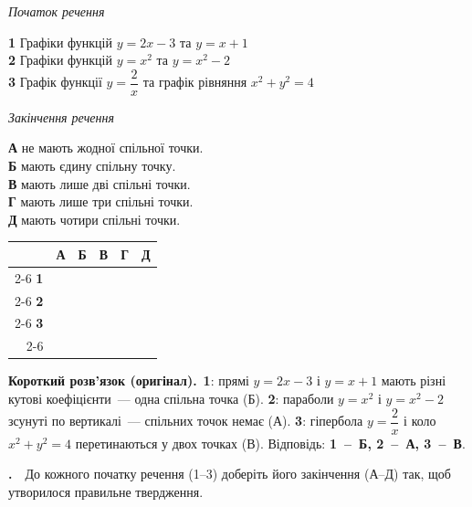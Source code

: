 \documentclass[12pt]{article}
\newcommand{\matchingGrid}{%
    \begingroup
    \renewcommand{\arraystretch}{1.15}
    \setlength{\tabcolsep}{4pt}
    \footnotesize
    \begin{tabular}{r|c|c|c|c|c|}
         \multicolumn{1}{c}{} & \multicolumn{1}{c}{\textbf{А}} & \multicolumn{1}{c}{\textbf{Б}} & \multicolumn{1}{c}{\textbf{В}} & \multicolumn{1}{c}{\textbf{Г}} & \multicolumn{1}{c}{\textbf{Д}} \\ \cline{2-6}
         \textbf{1} & \phantom{X} & \phantom{X} & \phantom{X} & \phantom{X} & \phantom{X} \\ \cline{2-6}
         \textbf{2} & & & & & \\ \cline{2-6}
         \textbf{3} & & & & & \\ \cline{2-6}
    \end{tabular}
    \endgroup
}
\newcounter{zad}
\newcommand{\zadnum}{\stepcounter{zad}\textbf{\thezad.}\ \ }
\newcommand{\solution}[1]{%
\par\vspace{0.12cm}
\begin{tcolorbox}[colback=titleBg!45, colframe=mainGreen!55, boxrule=0.4pt, arc=2pt,
    left=6pt, right=6pt, top=3pt, bottom=3pt, breakable]
\footnotesize\textbf{Короткий розв'язок (оригінал).}\ #1
\end{tcolorbox}
\par\vspace{0.12cm}
}
\begin{document}
\vspace{0.3cm}
\noindent
\begin{minipage}[t]{0.42\textwidth}
\textit{Початок речення}\par\vspace{0.2cm}
\textbf{1} \quad Графіки функцій $y = 2x - 3$ та $y = x + 1$\\[0.3cm]
\textbf{2} \quad Графіки функцій $y = x^2$ та $y = x^2 - 2$\\[0.3cm]
\textbf{3} \quad Графік функції $y = \dfrac{2}{x}$ та графік рівняння $x^2 + y^2 = 4$
\end{minipage}
\hfill
\begin{minipage}[t]{0.42\textwidth}
\textit{Закінчення речення}\par\vspace{0.2cm}
\textbf{А} \quad не мають жодної спільної точки.\\[0.15cm]
\textbf{Б} \quad мають єдину спільну точку.\\[0.15cm]
\textbf{В} \quad мають лише дві спільні точки.\\[0.15cm]
\textbf{Г} \quad мають лише три спільні точки.\\[0.15cm]
\textbf{Д} \quad мають чотири спільні точки.
\end{minipage}
\hfill
\begin{minipage}[t]{0.14\textwidth}
\vspace{0.5cm}
\begin{flushright}\matchingGrid\end{flushright}
\end{minipage}

\solution{\textbf{1}: прямі $y=2x-3$ і $y=x+1$ мають різні кутові коефіцієнти~--- одна спільна точка (Б). \textbf{2}: параболи $y=x^2$ і $y=x^2-2$ зсунуті по вертикалі~--- спільних точок немає (А). \textbf{3}: гіпербола $y=\dfrac{2}{x}$ і коло $x^2+y^2=4$ перетинаються у двох точках (В). Відповідь: \textbf{1~--~Б, 2~--~А, 3~--~В}.}

\vspace{0.5cm}
\noindent\zadnum До кожного початку речення (1--3) доберіть його закінчення (А--Д) так, щоб утворилося правильне твердження.
\end{document}
